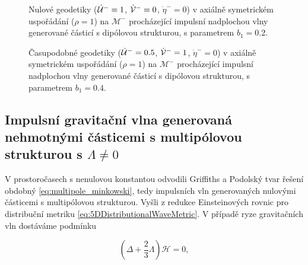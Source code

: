 \begin{figure}[ht]
    \centering
    \caption{Nulové geodetiky ($\dot {\mathcal{U}}^-=1$, $\dot {\mathcal{V}}^-=0$, $\dot \eta^-=0$) v axiálně symetrickém uspořádání ($\rho=1$) na $\mathcal{M}^-$ procházející impulsní nadplochou vlny generované částicí s dipólovou strukturou,
    s parametrem $b_1=0.2$.}
    \label{fig:DipoleAxial}
\end{figure}
\begin{figure}[ht]
    \centering
    \caption{Časupodobné geodetiky ($\dot {\mathcal{U}}^-=0.5$, $\dot {\mathcal{V}}^-=1$, $\dot \eta^-=0$) v axiálně symetrickém uspořádání ($\rho=1$) na $\mathcal{M}^-$ procházející impulsní nadplochou vlny generované částicí s dipólovou strukturou,
    s parametrem $b_1=0.4$.}
    \label{fig:DipoleAxialTimelike}
\end{figure}
\clearpage

\subsection{Impulsní gravitační vlna generovaná nehmotnými částicemi s multipólovou strukturou s $\Lambda\neq 0$}

V prostoročasech s nenulovou konstantou odvodili Griffiths a Podolský \cite{Podolsky1997} tvar řešení obdobný \eqref{eq:multipole_minkowski},
tedy impulsních vln generovaných nulovými částicemi s multipólovou strukturou. Vyšli z redukce Einsteinových rovnic pro distribuční
metriku \eqref{eq:5DDistributionalWaveMetric}. V případě ryze gravitačních vln dostáváme podmínku

\begin{equation}
    \label{eq:podminka_na_H_lambda_stare}
    \left(\Delta + \frac{2}{3} \Lambda \right)\mathcal{H} = 0,
\end{equation}

